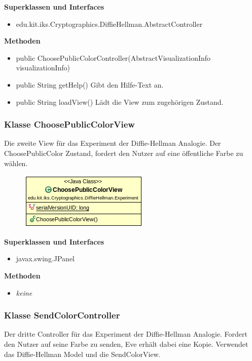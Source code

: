 \documentclass{article}
\begin{document}
      \textbf{Superklassen und Interfaces}
      \begin{itemize}
        \item edu.kit.iks.Cryptographics.DiffieHellman.AbstractController
      \end{itemize}

      \textbf{Methoden}
      \begin{itemize}
          \item public ChoosePublicColorController(AbstractVisualizationInfo visualizationInfo)
        \item public String getHelp() \newline
        Gibt den Hilfe-Text an.
        \item public String loadView() \newline
        Lädt die View zum zugehörigen Zustand.
      \end{itemize}

\subsubsection{Klasse ChoosePublicColorView}
      Die zweite View für das Experiment der Diffie-Hellman Analogie.
      Der ChoosePublicColor Zustand, fordert den Nutzer auf
      eine öffentliche Farbe zu wählen.

      \begin{figure}[H]
        \centering
        \includegraphics{resources/edu-kit-iks-Cryptographics-DiffieHellman-Experiment-ChoosePublicColorView}
      \end{figure}

      \textbf{Superklassen und Interfaces}
      \begin{itemize}
        \item javax.swing.JPanel
      \end{itemize}

      \textbf{Methoden}
      \begin{itemize}
        \item \textit{keine}
      \end{itemize}

\subsubsection{Klasse SendColorController}
      Der dritte Controller für das Experiment der Diffie-Hellman Analogie.
      Fordert den Nutzer auf seine Farbe zu senden, Eve erhält dabei eine Kopie.
      Verwendet das Diffie-Hellman Model und die SendColorView.
\end{document}
